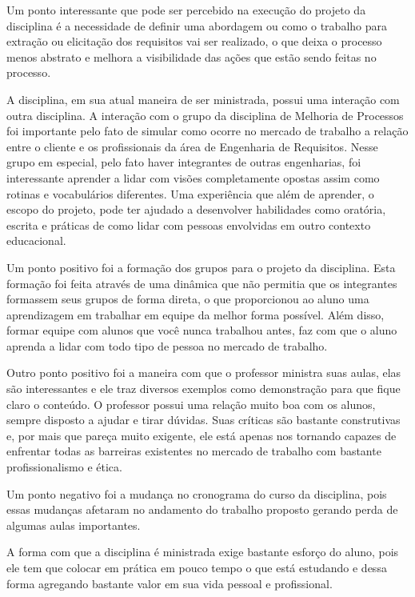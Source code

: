 \indent Um ponto interessante que pode ser percebido na execução do projeto da disciplina é a necessidade de definir 
uma abordagem ou como o trabalho para extração ou elicitação dos requisitos vai ser realizado, o que deixa o processo 
menos abstrato e melhora a visibilidade das ações que estão sendo feitas no processo.

\indent A disciplina, em sua atual maneira de ser ministrada, possui uma interação com outra disciplina. A interação 
com o grupo da disciplina de Melhoria de Processos foi importante pelo fato de simular como ocorre no mercado de 
trabalho a relação entre o cliente e os profissionais da área de Engenharia de Requisitos. Nesse grupo em especial, 
pelo fato haver integrantes de outras engenharias, foi interessante aprender a lidar com visões completamente opostas 
assim como rotinas e vocabulários diferentes. Uma experiência que além de aprender, o escopo do projeto, pode ter ajudado 
a desenvolver habilidades como oratória, escrita e práticas de como lidar com pessoas envolvidas em outro contexto 
educacional.

\indent Um ponto positivo foi a formação dos grupos para o projeto da disciplina. Esta formação foi feita através de uma 
dinâmica que não permitia que os integrantes formassem seus grupos de forma direta, o que proporcionou ao aluno uma 
aprendizagem em trabalhar em equipe da melhor forma possível. Além disso, formar equipe com alunos que você nunca trabalhou antes, 
faz com que o aluno aprenda a lidar com todo tipo de pessoa no mercado de trabalho.


\indent Outro ponto positivo foi a maneira com que o professor ministra suas aulas, elas são interessantes e ele traz diversos 
exemplos como demonstração para que fique claro o conteúdo. O professor possui uma relação muito boa com os alunos, sempre
disposto a ajudar e tirar dúvidas. Suas críticas são bastante construtivas e, por mais que pareça muito exigente, ele está 
apenas nos tornando capazes de enfrentar todas as barreiras existentes no mercado de trabalho com bastante profissionalismo 
e ética.

\indent Um ponto negativo foi a mudança no cronograma do curso da disciplina, pois essas mudanças afetaram no andamento do 
trabalho proposto gerando perda de algumas aulas importantes.

\indent A forma com que a disciplina é ministrada exige bastante esforço do aluno, pois ele tem que colocar em prática em 
pouco tempo o que está estudando e dessa forma agregando bastante valor em sua vida pessoal e profissional.


